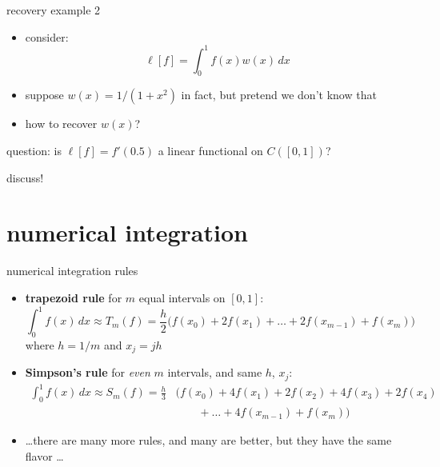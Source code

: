 \documentclass[10pt,
               svgnames,
               hyperref={colorlinks,citecolor=DeepPink4,linkcolor=FireBrick,urlcolor=Maroon},
               usepdftitle=false]{beamer}
\begin{document}
\begin{frame}{recovery example 2}

\begin{itemize}
\item consider:
	$$\ell[f] = \int_0^1 f(x) w(x)\,dx$$
\item suppose $w(x)=1/(1+x^2)$ in fact, but pretend we don't know that
\item how to recover $w(x)$?

\end{itemize}
\end{frame}


\begin{frame}{question: is $\ell[f] = f'(0.5)$ a linear functional on $C([0,1])$?}

discuss!

\vspace{70mm}
\end{frame}


\section{numerical integration}

\begin{frame}{numerical integration rules}

\begin{itemize}
\item \textbf{trapezoid rule} for $m$ equal intervals on $[0,1]$:
     $$\int_0^1 f(x)\,dx \approx T_m(f) = \frac{h}{2} \Big(f(x_0) + 2 f(x_1) + \dots + 2 f(x_{m-1}) + f(x_m)\Big)$$
where $h=1/m$ and $x_j = j h$
\item \textbf{Simpson's rule} for \emph{even} $m$ intervals, and same $h$, $x_j$:
\begin{align*}
\int_0^1 f(x)\,dx \approx S_m(f) = \frac{h}{3} &\Big(f(x_0) + 4 f(x_1) + 2 f(x_2) + 4 f(x_3) + 2 f(x_4) \\
&\qquad + \dots + 4 f(x_{m-1}) + f(x_m)\Big)
\end{align*}
\item \dots there are many more rules, and many are better, but they have the same flavor \dots
\end{itemize}
\end{frame}
\end{document}
